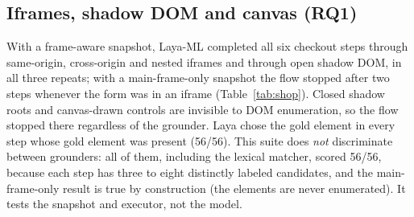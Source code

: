 \documentclass[11pt,a4paper]{article}
\begin{document}
\subsection{Iframes, shadow DOM and canvas (RQ1)}
With a frame-aware snapshot, Laya-ML completed all six checkout steps through same-origin, cross-origin and nested iframes and through open shadow DOM, in all three repeats; with a main-frame-only snapshot the flow stopped after two steps whenever the form was in an iframe (Table~\ref{tab:shop}). Closed shadow roots and canvas-drawn controls are invisible to DOM enumeration, so the flow stopped there regardless of the grounder. Laya chose the gold element in every step whose gold element was present (56/56). This suite does \emph{not} discriminate between grounders: all of them, including the lexical matcher, scored 56/56, because each step has three to eight distinctly labeled candidates, and the main-frame-only result is true by construction (the elements are never enumerated). It tests the snapshot and executor, not the model.

\begin{table}[t]\centering\small

\caption{Checkout flow (Laya-ML): steps completed out of six, by location of the payment form and snapshot mode.}\label{tab:shop}
\end{table}
\end{document}
